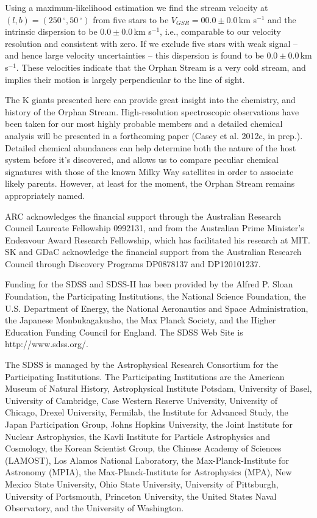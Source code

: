 \documentclass{emulateapj}
\begin{document}
Using a maximum-likelihood estimation we find the stream velocity at $(l, b) = (250\,^\circ, 50\,^\circ)$ from five stars to be $V_{GSR} = 00.0 \pm 0.0$\,km s$^{-1}$ and the intrinsic dispersion to be $0.0 \pm 0.0$\,km s$^{-1}$, i.e., comparable to our velocity resolution and consistent with zero. If we exclude five stars with weak signal \--- and hence large velocity uncertainties \--- this dispersion is found to be $0.0 \pm 0.0$\,km s$^{-1}$. These velocities indicate that the Orphan Stream is a very cold stream, and implies their motion is largely perpendicular to the line of sight.

The K giants presented here can provide great insight into the chemistry, and history of the Orphan Stream. High-resolution spectroscopic observations have been taken for our most highly probable members and a detailed chemical analysis will be presented in a forthcoming paper (Casey et al. 2012c, in prep.). Detailed chemical abundances can help determine both the nature of the host system before it's discovered, and allows us to compare peculiar chemical signatures with those of the known Milky Way satellites in order to associate likely parents. However, at least for the moment, the Orphan Stream remains appropriately named.


\acknowledgements
ARC acknowledges the financial support through the Australian Research Council Laureate Fellowship 0992131, and from the Australian Prime Minister's Endeavour Award Research Fellowship, which has facilitated his research at MIT. SK and GDaC acknowledge the financial support from the Australian Research Council through Discovery Programs DP0878137 and DP120101237.

Funding for the SDSS and SDSS-II has been provided by the Alfred P. Sloan Foundation, the Participating Institutions, the National Science Foundation, the U.S. Department of Energy, the National Aeronautics and Space Administration, the Japanese Monbukagakusho, the Max Planck Society, and the Higher Education Funding Council for England. The SDSS Web Site is http://www.sdss.org/.

The SDSS is managed by the Astrophysical Research Consortium for the Participating Institutions. The Participating Institutions are the American Museum of Natural History, Astrophysical Institute Potsdam, University of Basel, University of Cambridge, Case Western Reserve University, University of Chicago, Drexel University, Fermilab, the Institute for Advanced Study, the Japan Participation Group, Johns Hopkins University, the Joint Institute for Nuclear Astrophysics, the Kavli Institute for Particle Astrophysics and Cosmology, the Korean Scientist Group, the Chinese Academy of Sciences (LAMOST), Los Alamos National Laboratory, the Max-Planck-Institute for Astronomy (MPIA), the Max-Planck-Institute for Astrophysics (MPA), New Mexico State University, Ohio State University, University of Pittsburgh, University of Portsmouth, Princeton University, the United States Naval Observatory, and the University of Washington.



\end{document}
